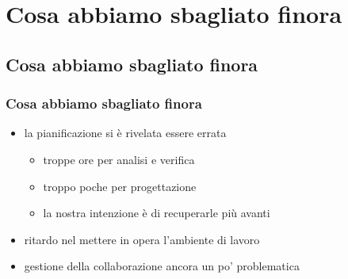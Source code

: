 \section{Cosa abbiamo sbagliato finora}

\subsection*{Cosa abbiamo sbagliato finora}

\begin{frame}
\frametitle{Cosa abbiamo sbagliato finora}

\begin{itemize}
\item la pianificazione si è rivelata essere errata
\begin{itemize}
\item troppe ore per analisi e verifica
\item troppo poche per progettazione
\item la nostra intenzione è di recuperarle più avanti
\end{itemize}

\item ritardo nel mettere in opera l'ambiente di lavoro
\item gestione della collaborazione ancora un po' problematica
\end{itemize}

\end{frame}

